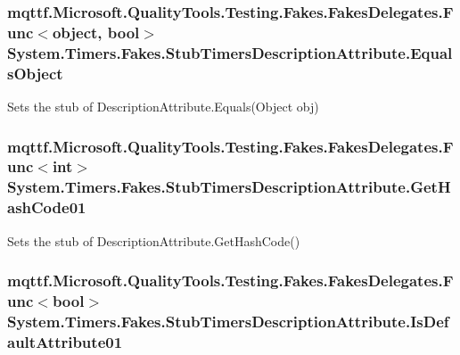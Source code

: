 \hypertarget{class_system_1_1_timers_1_1_fakes_1_1_stub_timers_description_attribute_a70120cda8d0400139935d0e556057ae7}{
\subsubsection[{Equals\-Object}]{\setlength{\rightskip}{0pt plus 5cm}mqttf.\-Microsoft.\-Quality\-Tools.\-Testing.\-Fakes.\-Fakes\-Delegates.\-Func$<$object, bool$>$ System.\-Timers.\-Fakes.\-Stub\-Timers\-Description\-Attribute.\-Equals\-Object}}\label{class_system_1_1_timers_1_1_fakes_1_1_stub_timers_description_attribute_a70120cda8d0400139935d0e556057ae7}


Sets the stub of Description\-Attribute.\-Equals(\-Object obj)

\hypertarget{class_system_1_1_timers_1_1_fakes_1_1_stub_timers_description_attribute_a96d543e970a704c3f755d7572457bb9d}{
\subsubsection[{Get\-Hash\-Code01}]{\setlength{\rightskip}{0pt plus 5cm}mqttf.\-Microsoft.\-Quality\-Tools.\-Testing.\-Fakes.\-Fakes\-Delegates.\-Func$<$int$>$ System.\-Timers.\-Fakes.\-Stub\-Timers\-Description\-Attribute.\-Get\-Hash\-Code01}}\label{class_system_1_1_timers_1_1_fakes_1_1_stub_timers_description_attribute_a96d543e970a704c3f755d7572457bb9d}


Sets the stub of Description\-Attribute.\-Get\-Hash\-Code()

\hypertarget{class_system_1_1_timers_1_1_fakes_1_1_stub_timers_description_attribute_af590fb4d1d020716be48be2a85e9d9cb}{
\subsubsection[{Is\-Default\-Attribute01}]{\setlength{\rightskip}{0pt plus 5cm}mqttf.\-Microsoft.\-Quality\-Tools.\-Testing.\-Fakes.\-Fakes\-Delegates.\-Func$<$bool$>$ System.\-Timers.\-Fakes.\-Stub\-Timers\-Description\-Attribute.\-Is\-Default\-Attribute01}}\label{class_system_1_1_timers_1_1_fakes_1_1_stub_timers_description_attribute_af590fb4d1d020716be48be2a85e9d9cb}


